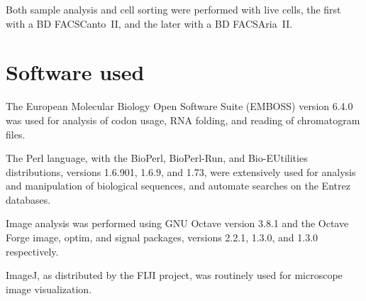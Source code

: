       Both sample analysis and cell sorting were performed with live cells, the
      first with a BD FACSCanto~II, and the later with a BD FACSAria~II.

  \section{Software used}
    \label{sec:methods:software}

    The European Molecular Biology Open Software Suite (EMBOSS) version 6.4.0
    was used for analysis of codon usage, RNA folding, and reading of
    chromatogram files.

    The Perl language, with the BioPerl, BioPerl-Run, and Bio-EUtilities
    distributions, versions 1.6.901, 1.6.9, and 1.73, were extensively used
    for analysis and manipulation of biological sequences, and automate searches
    on the Entrez databases.

    Image analysis was performed using GNU Octave version 3.8.1 and the Octave
    Forge image, optim, and signal packages, versions 2.2.1, 1.3.0, and 1.3.0
    respectively.

    ImageJ, as distributed by the FIJI project, was routinely used for microscope
    image visualization.

